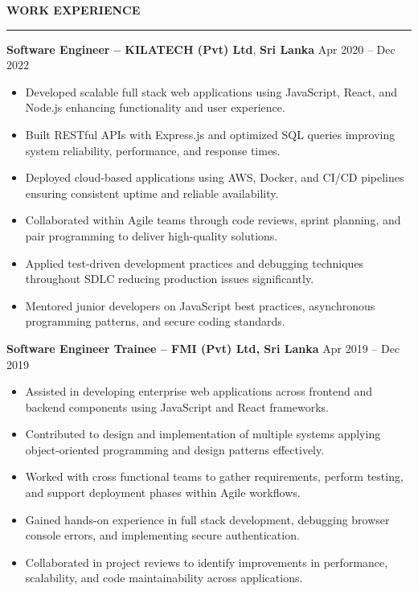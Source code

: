\documentclass[10pt,letterpaper]{article}
\begin{document}
\vspace{8pt}

\textbf{WORK EXPERIENCE}\\[-8pt]
\noindent\rule{\textwidth}{1pt}

\vspace{-2pt}

\textbf{Software Engineer -- KILATECH (Pvt) Ltd}, \textbf{Sri Lanka} \hfill Apr 2020 -- Dec 2022

\vspace{-1pt}

\begin{itemize}
\item Developed scalable full stack web applications using JavaScript, React, and Node.js enhancing functionality and user experience.
\item Built RESTful APIs with Express.js and optimized SQL queries improving system reliability, performance, and response times.
\item Deployed cloud-based applications using AWS, Docker, and CI/CD pipelines ensuring consistent uptime and reliable availability.
\item Collaborated within Agile teams through code reviews, sprint planning, and pair programming to deliver high-quality solutions.
\item Applied test-driven development practices and debugging techniques throughout SDLC reducing production issues significantly.
\item Mentored junior developers on JavaScript best practices, asynchronous programming patterns, and secure coding standards.
\end{itemize}

\textbf{Software Engineer Trainee -- FMI (Pvt) Ltd, Sri Lanka} \hfill Apr 2019 -- Dec 2019

\vspace{-1pt}

\begin{itemize}
\item Assisted in developing enterprise web applications across frontend and backend components using JavaScript and React frameworks.
\item Contributed to design and implementation of multiple systems applying object-oriented programming and design patterns effectively.
\item Worked with cross functional teams to gather requirements, perform testing, and support deployment phases within Agile workflows.
\item Gained hands-on experience in full stack development, debugging browser console errors, and implementing secure authentication.
\item Collaborated in project reviews to identify improvements in performance, scalability, and code maintainability across applications.
\end{itemize}
\end{document}
